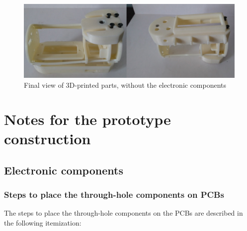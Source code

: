 \documentclass[12pt,letterpaper]{article}
\numberwithin{figure}{section}
\numberwithin{equation}{section}
\numberwithin{table}{section}
\begin{document}
 \begin{figure}[H]
     \centering
     \includegraphics[scale=0.5]{Figuras/figure_28.jpg}
     \caption{Final view of 3D-printed parts, without the electronic components}
     \label{fig:28}
 \end{figure}





\newpage
\section{Notes for the prototype construction}\label{construccion}

\subsection{Electronic components}

\subsubsection{Steps to place the through-hole components on PCBs}

The steps to place the through-hole components on the PCBs are described in the following itemization: 
\end{document}
